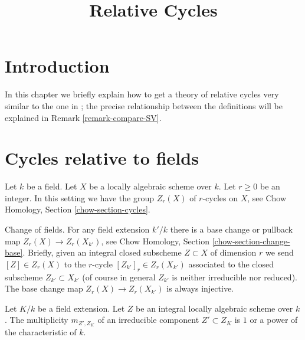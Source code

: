 

%


\title{Relative Cycles}


\maketitle

\label{section-phantom}

\tableofcontents



\section{Introduction}
\label{section-introduction}

\noindent
In this chapter we briefly explain how to get a theory of relative cycles
very similar to the one in \cite{SV}; the precise relationship between the
definitions will be explained in Remark \ref{remark-compare-SV}.



\section{Cycles relative to fields}
\label{section-relative-fields}

\noindent
Let $k$ be a field. Let $X$ be a locally algebraic scheme over $k$.
Let $r \geq 0$ be an integer. In this setting we have the group
$Z_r(X)$ of $r$-cycles on $X$, see
Chow Homology, Section \ref{chow-section-cycles}.

\medskip\noindent
Change of fields. For any field extension $k'/k$ there is a base change or
pullback map $Z_r(X) \to Z_r(X_{k'})$, see
Chow Homology, Section \ref{chow-section-change-base}.
Briefly, given an integral closed subscheme $Z \subset X$
of dimension $r$ we send $[Z] \in Z_r(X)$ to the $r$-cycle
$[Z_{k'}]_r \in Z_r(X_{k'})$ associated to the closed subscheme
$Z_{k'} \subset X_{k'}$ (of course in general $Z_{k'}$
is neither irreducible nor reduced). The base change map
$Z_r(X) \to Z_r(X_{k'})$ is always injective.

\begin{lemma}
\label{lemma-multiplicities-field-extension}
Let $K/k$ be a field extension. Let $Z$ be an integral locally algebraic
scheme over $k$. The multiplicity $m_{Z', Z_K}$ of an irreducible
component $Z' \subset Z_K$ is $1$ or a power of the characteristic of $k$.
\end{lemma}


